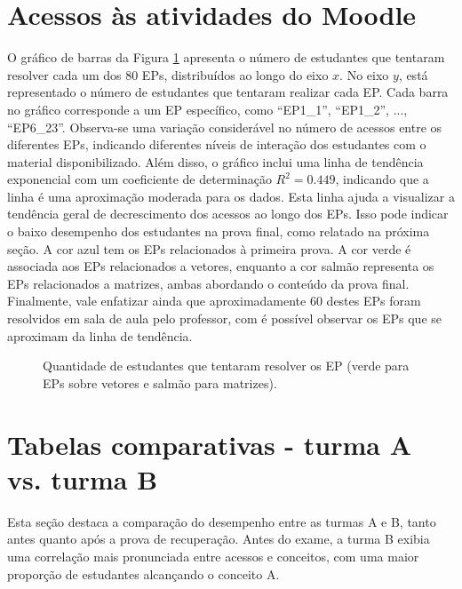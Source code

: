 \section{Acessos às atividades do Moodle}

O gráfico de barras da Figura \ref{fig:ApeA_Acessos_EPs} apresenta o número de estudantes que tentaram resolver cada um dos 80 EPs, distribuídos ao longo do eixo \( x \). No eixo \( y \), está representado o número de estudantes que tentaram realizar cada EP. Cada barra no gráfico corresponde a um EP específico, como ``EP1\_1'', ``EP1\_2'', ..., ``EP6\_23''. Observa-se uma variação considerável no número de acessos entre os diferentes EPs, indicando diferentes níveis de interação dos estudantes com o material disponibilizado. Além disso, o gráfico inclui uma linha de tendência exponencial com um coeficiente de determinação \( R^2=0.449 \), indicando que a linha é uma aproximação moderada para os dados. Esta linha ajuda a visualizar a tendência geral de decrescimento dos acessos ao longo dos EPs. Isso pode indicar o baixo desempenho dos estudantes na prova final, como relatado na próxima seção. A cor azul tem os EPs relacionados à primeira prova. A cor verde é associada aos EPs relacionados a vetores, enquanto a cor salmão representa os EPs relacionados a matrizes, ambas abordando o conteúdo da prova final. Finalmente, vale enfatizar ainda que aproximadamente 60 destes EPs foram resolvidos em sala de aula pelo professor, com é possível observar os EPs que se aproximam da linha de tendência.

\begin{figure}[!ht]
    \centering
    \caption{Quantidade de estudantes que tentaram resolver os EP (verde para EPs sobre vetores e salmão para matrizes).}
    \label{fig:ApeA_Acessos_EPs}
\end{figure}




\section{Tabelas comparativas - turma A vs. turma B}

Esta seção destaca a comparação do desempenho entre as turmas A e B, tanto antes quanto após a prova de recuperação. Antes do exame, a turma B exibia uma correlação mais pronunciada entre acessos e conceitos, com uma maior proporção de estudantes alcançando o conceito A. 

